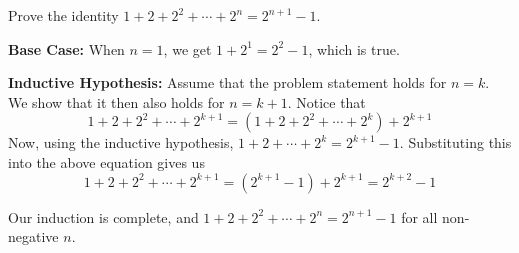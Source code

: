 \begin{exmp}  Prove the identity $1+2+2^2+\cdots +2^n=2^{n+1}-1$.  \end{exmp}
\begin{soln}  
\textbf{Base Case:}  When $n=1$, we get $1+2^1=2^{2}-1$, which is true.

\textbf{Inductive Hypothesis:}  Assume that the problem statement holds for $n=k$.  We show that it then also holds for $n=k+1$.
Notice that $$1+2+2^2+\cdots+2^{k+1}=\left(1+2+2^2+\cdots+2^k\right)+2^{k+1}$$
Now, using the inductive hypothesis, $1+2+\cdots+2^k=2^{k+1}-1$.  Substituting this into the above equation gives us $$1+2+2^2+\cdots+2^{k+1}=\left(2^{k+1}-1\right)+2^{k+1}=2^{k+2}-1$$

Our induction is complete, and $1+2+2^2+\cdots+2^n=2^{n+1}-1$ for all non-negative $n$.  \end{soln}

